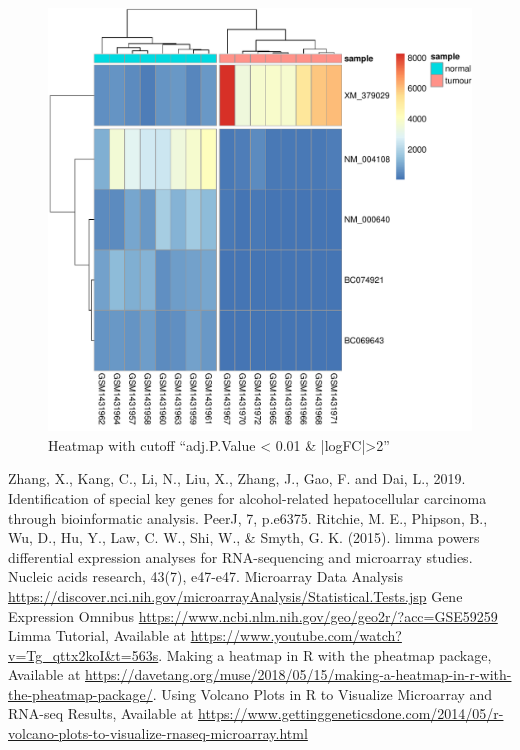 \documentclass[12pt, ]{article}
\begin{document}
\begin{figure}[!htbp]
    \includegraphics[width=\textwidth,]{heatmap-adjlogFC.pdf}
    \caption{Heatmap with cutoff ``adj.P.Value < 0.01 \& |logFC|>2''}
    \label{fig:heat2}
\end{figure}

\begin{thebibliography}{9}
     Zhang, X., Kang, C., Li, N., Liu, X., Zhang, J., Gao, F. and Dai, L., 2019. Identification of special key genes for alcohol-related hepatocellular carcinoma through bioinformatic analysis. PeerJ, 7, p.e6375.
     Ritchie, M. E., Phipson, B., Wu, D., Hu, Y., Law, C. W., Shi, W., \& Smyth, G. K. (2015). limma powers differential expression analyses for RNA-sequencing and microarray studies. Nucleic acids research, 43(7), e47-e47.
    \bibitem {} Microarray Data Analysis \url{https://discover.nci.nih.gov/microarrayAnalysis/Statistical.Tests.jsp}
    \bibitem {}   Gene Expression Omnibus \url{https://www.ncbi.nlm.nih.gov/geo/geo2r/?acc=GSE59259}
    \bibitem {}  Limma Tutorial, Available at \url{https://www.youtube.com/watch?v=Tg_qttx2koI&t=563s}.
    \bibitem {} Making a heatmap in R with the pheatmap package, Available at \url{https://davetang.org/muse/2018/05/15/making-a-heatmap-in-r-with-the-pheatmap-package/}.
    \bibitem {} Using Volcano Plots in R to Visualize Microarray and RNA-seq Results, Available at \url{https://www.gettinggeneticsdone.com/2014/05/r-volcano-plots-to-visualize-rnaseq-microarray.html}


\end{thebibliography}
\end{document}
